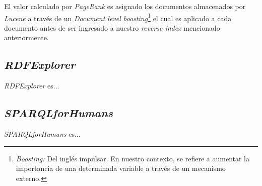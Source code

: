 El valor calculado por \textit{PageRank} es asignado los documentos almacenados
por \textit{Lucene} a través de un \textit{Document level
boosting}\footnote{\textit{Boosting:} Del inglés impulsar. En nuestro contexto,
se refiere a aumentar la importancia de una determinada variable a través de un
mecanismo externo.} el cual es aplicado a cada documento antes de ser ingresado
a nuestro \textit{reverse index} mencionado anteriormente.

\subsection{\textit{RDFExplorer}}

\textit{RDFExplorer} es...

\subsection{\textit{SPARQLforHumans}}

\textit{SPARQLforHumans} es...

